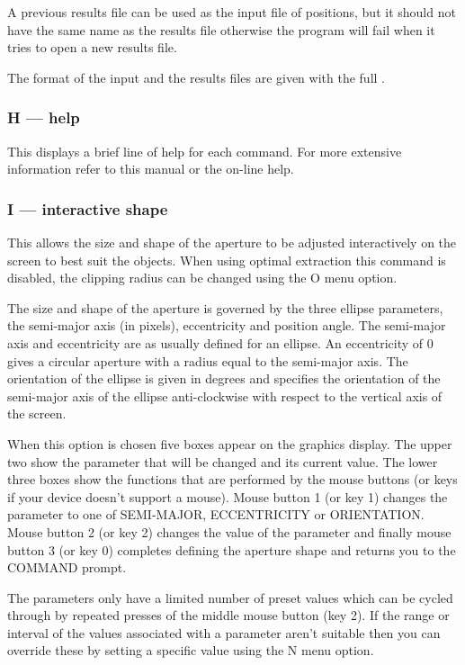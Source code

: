 \documentclass[twoside,11pt,nolof]{starlink}
\begin{document}
A previous results file can be used as the input file of positions, but
it should not have the same name as the results file otherwise the
program will fail when it tries to open a new results file.

The format of the input and the results files are given with the full
 .

\subsubsection{H --- help}

This displays a brief line of help for each command. For more extensive
information refer to this manual or the on-line help.

\subsubsection{I --- interactive shape}

This allows the size and shape of the aperture to be adjusted
interactively on the screen to best suit the objects. When using
optimal extraction this command is disabled, the clipping radius
can be changed using the O menu option.

The size and shape of the aperture is governed by the three ellipse
parameters, the semi-major axis (in pixels), eccentricity and position
angle.  The semi-major axis and eccentricity are as usually defined
for an ellipse. An eccentricity of 0 gives a circular aperture with a
radius equal to the semi-major axis. The orientation of the ellipse is
given in degrees and specifies the orientation of the semi-major axis
of the ellipse anti-clockwise with respect to the vertical axis of the
screen.

When this option is chosen five boxes appear on the graphics display.
The upper two show the parameter that will be changed and its current
value. The lower three boxes show the functions that are performed by
the mouse buttons (or keys if your device doesn't support a
mouse). Mouse button 1 (or key 1) changes the parameter to one of
SEMI-MAJOR, ECCENTRICITY or ORIENTATION. Mouse button 2 (or key 2)
changes the value of the parameter and finally mouse button 3 (or key
0) completes defining the aperture shape and returns you to the
COMMAND prompt.

The parameters only have a limited number of
preset values which can be cycled through by repeated presses of the
middle mouse button (key 2).
If the range or interval of the values associated with a parameter
aren't suitable then you can override these by setting a specific
value using the N menu option.
\end{document}
